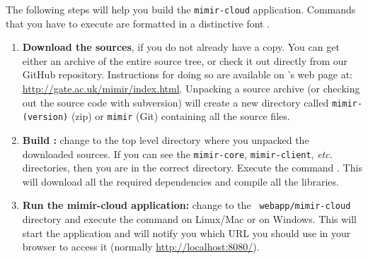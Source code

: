 The following steps will help you build the {\tt mimir-cloud} application.
Commands that you have to execute are formatted in a distinctive font
.
\begin{enumerate}
  \item {\bf Download the \Mimir{} sources}, if you do not already have a copy.
  You can get either an archive of the entire source tree, or check it out
  directly from our GitHub repository. Instructions for doing so are
  available on \Mimir{}'s web page at:
  \url{http://gate.ac.uk/mimir/index.html}.
  Unpacking a source archive (or checking out the source code with subversion)
  will create a new directory called {\tt mimir-(version)} (zip) or {\tt mimir}
  (Git) containing all the source files.
  \item {\bf Build \Mimir{}:} change to the top level directory where you
  unpacked the downloaded \Mimir{} sources. If you can see the {\tt mimir-core},
  {\tt mimir-client}, {\em etc.} directories, then you are in the correct
  directory. Execute the command . This will download all the
  required dependencies and compile all the \Mimir{} libraries.
  
  \item {\bf Run the mimir-cloud application:}  change to the {\tt
  webapp/mimir-cloud} directory and execute the command 
  on Linux/Mac or  on Windows. This will start the
  application and will notify you which URL you should use in your browser to
  access it (normally \url{http://localhost:8080/}).
\end{enumerate}
%

